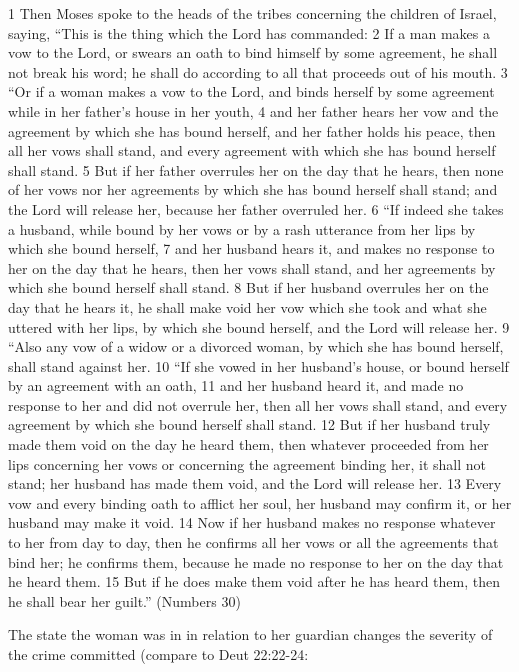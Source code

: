 \documentclass[11pt]{article}
\begin{document}
1 Then Moses spoke to the heads of the tribes concerning the children of Israel, saying, “This is the thing which the Lord has commanded: 2 If a man makes a vow to the Lord, or swears an oath to bind himself by some agreement, he shall not break his word; he shall do according to all that proceeds out of his mouth.
3 “Or if a woman makes a vow to the Lord, and binds herself by some agreement while in her father’s house in her youth, 4 and her father hears her vow and the agreement by which she has bound herself, and her father holds his peace, then all her vows shall stand, and every agreement with which she has bound herself shall stand. 5 But if her father overrules her on the day that he hears, then none of her vows nor her agreements by which she has bound herself shall stand; and the Lord will release her, because her father overruled her.
6 “If indeed she takes a husband, while bound by her vows or by a rash utterance from her lips by which she bound herself, 7 and her husband hears it, and makes no response to her on the day that he hears, then her vows shall stand, and her agreements by which she bound herself shall stand. 8 But if her husband overrules her on the day that he hears it, he shall make void her vow which she took and what she uttered with her lips, by which she bound herself, and the Lord will release her.
9 “Also any vow of a widow or a divorced woman, by which she has bound herself, shall stand against her.
10 “If she vowed in her husband’s house, or bound herself by an agreement with an oath, 11 and her husband heard it, and made no response to her and did not overrule her, then all her vows shall stand, and every agreement by which she bound herself shall stand. 12 But if her husband truly made them void on the day he heard them, then whatever proceeded from her lips concerning her vows or concerning the agreement binding her, it shall not stand; her husband has made them void, and the Lord will release her. 13 Every vow and every binding oath to afflict her soul, her husband may confirm it, or her husband may make it void. 14 Now if her husband makes no response whatever to her from day to day, then he confirms all her vows or all the agreements that bind her; he confirms them, because he made no response to her on the day that he heard them. 15 But if he does make them void after he has heard them, then he shall bear her guilt.” (Numbers 30)

The state the woman was in in relation to her guardian changes the severity of the crime committed (compare to Deut 22:22-24:
\end{document}
